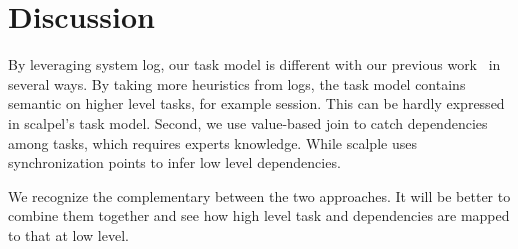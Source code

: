 
\section{Discussion}
\label{sec:discussion}

By leveraging system log, our task model is different with
our previous work~\cite{Haohui2008} in several ways.  By taking more
heuristics from logs, the task model contains semantic on
higher level tasks, for example session.  This can be hardly
expressed in scalpel's task model.  Second, we use
value-based join to catch dependencies among tasks, which
requires experts knowledge. While scalple uses
synchronization points to infer low level dependencies.

We recognize the complementary between the two approaches.
It will be better to combine them together and see how high
level task and dependencies are mapped to that at low level.
